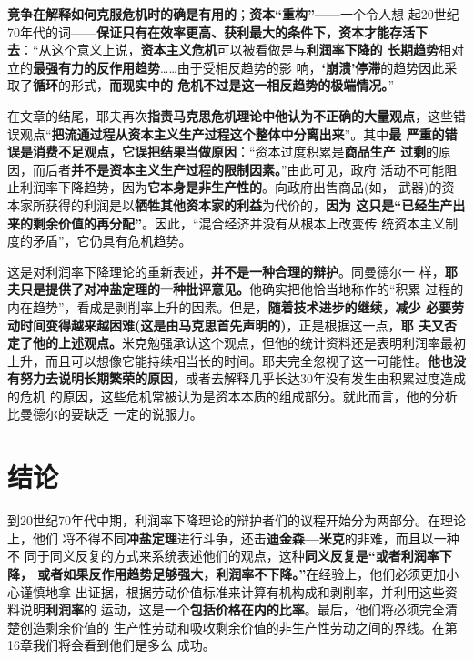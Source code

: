 \textbf{竞争在解释如何克服危机时的确是有用的}；\textbf{资本“重构”}——一个令人想
起20世纪70年代的词——\textbf{保证只有在效率更高、获利最大的条件下，资本才能存活下
  去}：“从这个意义上说，\textbf{资本主义危机}可以被看做是与\textbf{利润率下降的
  长期趋势}相对立的\textbf{最强有力的反作用趋势}……由于受相反趋势的影
响，\textbf{‘崩溃’停滞}的趋势因此采取了\textbf{循环}的形式，\textbf{而现实中的
  危机不过是这一相反趋势的极端情况。}”

在文章的结尾，耶夫再次\textbf{指责马克思危机理论中他认为不正确的大量观点}，这些错
误观点“\textbf{把流通过程从资本主义生产过程这个整体中分离出来}”。其中\textbf{最
  严重的错误是消费不足观点，它误把结果当做原因}：“资本过度积累是\textbf{商品生产
  过剩}的原因，而后者\textbf{并不是资本主义生产过程的限制因素。}”由此可见，政府
活动不可能阻止利润率下降趋势，因为\textbf{它本身是非生产性的}。向政府出售商品(如，
武器)的资本家所获得的利润是以\textbf{牺牲其他资本家的利益}为代价的，\textbf{因为
  这只是“已经生产出来的剩余价值的再分配”}。因此，“混合经济并没有从根本上改变传
统资本主义制度的矛盾”，它仍具有危机趋势。

这是对利润率下降理论的重新表述，\textbf{并不是一种合理的辩护}。同曼德尔一
样，\textbf{耶夫只是提供了对冲盐定理的一种批评意见。}他确实把他恰当地称作的“积累
过程的内在趋势”，看成是剥削率上升的因素。但是，\textbf{随着技术进步的继续，减少
  必要劳动时间变得越来越困难(这是由马克思首先声明的)}，正是根据这一点，\textbf{耶
  夫又否定了他的上述观点。}米克勉强承认这个观点，但他的统计资料还是表明利润率最初
上升，而且可以想像它能持续相当长的时间。耶夫完全忽视了这一可能性。\textbf{他也没
  有努力去说明长期繁荣的原因，}或者去解释几乎长达30年没有发生由积累过度造成的危机
的原因，这些危机常被认为是资本本质的组成部分。就此而言，他的分析比曼德尔的要缺乏
一定的说服力。

\section{结论}
到20世纪70年代中期，利润率下降理论的辩护者们的议程开始分为两部分。在理论上，他们
将不得不同\textbf{冲盐定理}进行斗争，还击\textbf{迪金森—米克}的非难，而且以一种不
同于同义反复的方式来系统表述他们的观点，这种\textbf{同义反复是“或者利润率下降，
  或者如果反作用趋势足够强大，利润率不下降。”}在经验上，他们必须更加小心谨慎地拿
出证据，根据劳动价值标准来计算有机构成和剥削率，并利用这些资料说明\textbf{利润率}的
运动，这是一个\textbf{包括价格在内的比率}。最后，他们将必须完全清楚创造剩余价值的
生产性劳动和吸收剩余价值的非生产性劳动之间的界线。在第16章我们将会看到他们是多么
成功。


